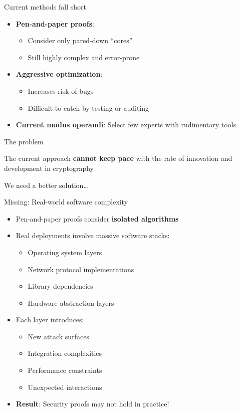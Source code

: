 \documentclass[aspectratio=169, lualatex, handout]{beamer}
\begin{document}
\begin{frame}{Current methods fall short}
	\begin{itemize}
		\item \textbf{Pen-and-paper proofs}:
		      \begin{itemize}
			      \item Consider only pared-down ``cores''
			      \item Still highly complex and error-prone
		      \end{itemize}
		\item \textbf{Aggressive optimization}:
		      \begin{itemize}
			      \item Increases risk of bugs
			      \item Difficult to catch by testing or auditing
		      \end{itemize}
		\item \textbf{Current modus operandi}: Select few experts with rudimentary tools
	\end{itemize}
\end{frame}

\begin{frame}{The problem}
	\begin{center}
		\Large
		The current approach \textbf{cannot keep pace} with the rate of innovation and development in cryptography
		\vspace{2em}

		\normalsize
		We need a better solution\ldots
	\end{center}
\end{frame}

\begin{frame}{Missing: Real-world software complexity}
	\begin{itemize}
		\item Pen-and-paper proofs consider \textbf{isolated algorithms}
		\item Real deployments involve massive software stacks:
		      \begin{itemize}
			      \item Operating system layers
			      \item Network protocol implementations
			      \item Library dependencies
			      \item Hardware abstraction layers
		      \end{itemize}
		\item Each layer introduces:
		      \begin{itemize}
			      \item New attack surfaces
			      \item Integration complexities
			      \item Performance constraints
			      \item Unexpected interactions
		      \end{itemize}
		\item \textbf{Result}: Security proofs may not hold in practice!
	\end{itemize}
\end{frame}
\end{document}
